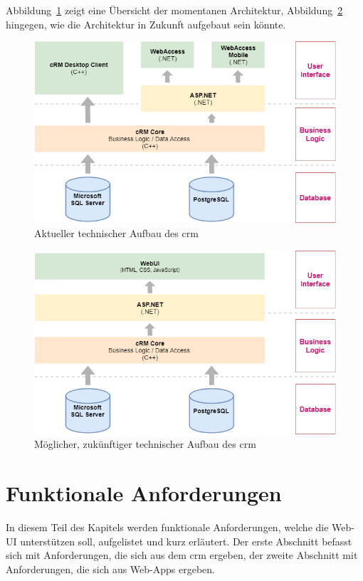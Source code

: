 Abbildung~\ref{fig:crm_technical_stack} zeigt eine Übersicht der momentanen Architektur, Abbildung~\ref{fig:crm_future_technical_stack} hingegen, wie die Architektur in Zukunft aufgebaut sein könnte.

\begin{figure}
    \centering
    \captionsetup{justification=centering}
    \includegraphics[width=\textwidth]{figures/crm_technical_stack.png}
        \caption{Aktueller technischer Aufbau des \gls{crm}}\label{fig:crm_technical_stack}
\end{figure}

\begin{figure}
    \centering
    \captionsetup{justification=centering}
    \includegraphics[width=\textwidth]{figures/crm_future_technical_stack.png}
        \caption{Möglicher, zukünftiger technischer Aufbau des \gls{crm}}\label{fig:crm_future_technical_stack}
\end{figure}


\section{Funktionale Anforderungen}
In diesem Teil des Kapitels werden funktionale Anforderungen, welche die Web-UI unterstützen soll, aufgelistet und kurz erläutert. Der erste Abschnitt befasst sich mit Anforderungen, die sich aus dem \gls{crm} ergeben, der zweite Abschnitt mit Anforderungen, die sich aus Web-Apps ergeben.

